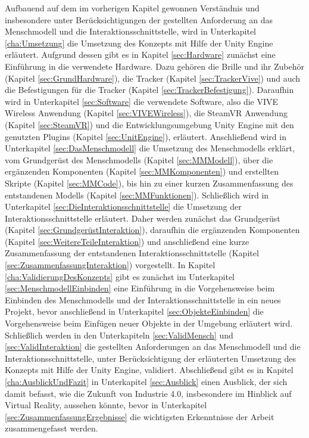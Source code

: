 \newline
Aufbauend auf dem im vorherigen Kapitel gewonnen Verständnis und insbesondere unter Berücksichtigungen der gestellten Anforderung an das Menschmodell und die Interaktionsschnittstelle, wird in Unterkapitel \ref{cha:Umsetzung} die Umsetzung des Konzepts mit Hilfe der Unity Engine erläutert. Aufgrund dessen gibt es in Kapitel \ref{sec:Hardware} zunächst eine Einführung in die verwendete Hardware. Dazu gehören die Brille und ihr Zubehör (Kapitel \ref{sec:GrundHardware}), die Tracker (Kapitel \ref{sec:TrackerVive}) und auch die Befestigungen für die Tracker (Kapitel \ref{sec:TrackerBefestigung}). Daraufhin wird in Unterkapitel \ref{sec:Software} die verwendete Software, also die VIVE Wireless Anwendung (Kapitel \ref{sec:VIVEWireless}), die SteamVR Anwendung (Kapitel \ref{sec:SteamVR}) und die Entwicklungsumgebung Unity Engine mit den genutzten Plugins (Kapitel \ref{sec:UnitEngine}), erläutert. Anschließend wird in Unterkapitel \ref{sec:DasMenschmodell} die Umsetzung des Menschmodells erklärt, vom Grundgerüst des Menschmodells (Kapitel \ref{sec:MMModell}), über die ergänzenden Komponenten (Kapitel \ref{sec:MMKomponenten}) und erstellten Skripte (Kapitel \ref{sec:MMCode}), bis hin zu einer kurzen Zusammenfassung des entstandenen Modells (Kapitel \ref{sec:MMFunktionen}). Schließlich wird in Unterkapitel \ref{sec:DieInteraktionsschnittstelle} die Umsetzung der Interaktionsschnittstelle erläutert. Daher werden zunächst das Grundgerüst (Kapitel \ref{sec:GrundgerüstInteraktion}), daraufhin die ergänzenden Komponenten (Kapitel \ref{sec:WeitereTeileInteraktion}) und anschließend eine kurze Zusammenfassung der entstandenen Interaktionsschnittstelle (Kapitel \ref{sec:ZusammenfassungInteraktion}) vorgestellt.
\newline
In Kapitel \ref{cha:ValidierungDesKonzepts} gibt es zunächst im Unterkapitel \ref{sec:MenschmodellEinbinden} eine Einführung in die Vorgehensweise beim Einbinden des Menschmodells und der Interaktionsschnittstelle in ein neues Projekt, bevor anschließend in Unterkapitel \ref{sec:ObjekteEinbinden} die Vorgehensweise beim Einfügen neuer Objekte in der Umgebung erläutert wird. Schließlich werden in den Unterkapiteln \ref{sec:ValidMensch} und \ref{sec:ValidInteraktion} die gestellten Anforderungen an das Menschmodell und die Interaktionsschnittstelle, unter Berücksichtigung der erläuterten Umsetzung des Konzepts mit Hilfe der Unity Engine, validiert.
\newline
Abschließend gibt es in Kapitel \ref{cha:AusblickUndFazit} in Unterkapitel \ref{sec:Ausblick} einen Ausblick, der sich damit befasst, wie die Zukunft von Industrie 4.0, insbesondere im Hinblick auf Virtual Reality, aussehen könnte, bevor in Unterkapitel \ref{sec:ZusammenfassungErgebnisse} die wichtigsten Erkenntnisse der Arbeit zusammengefasst werden.


